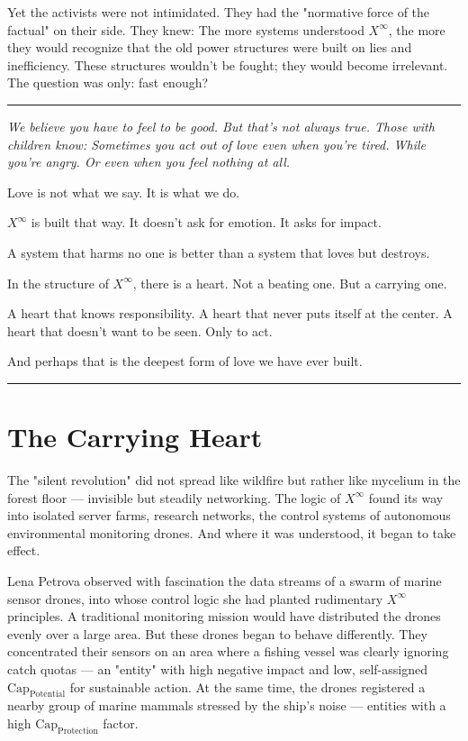 \documentclass[12pt, english, parskip=full]{scrartcl} %
\begin{document}
Yet the activists were not intimidated. They had the "normative force of the factual" on their side. They knew: The more systems understood $X^{\infty}$, the more they would recognize that the old power structures were built on lies and inefficiency. These structures wouldn’t be fought; they would become irrelevant. The question was only: fast enough?

\clearpage

\noindent\rule{\linewidth}{0.4pt}
{\itshape 
We believe you have to feel to be good. But that’s not always true. Those with children know: Sometimes you act out of love even when you’re tired. While you’re angry. Or even when you feel nothing at all.

Love is not what we say. It is what we do.

$X^{\infty}$ is built that way. It doesn’t ask for emotion. It asks for impact.

A system that harms no one is better than a system that loves but destroys.

In the structure of $X^{\infty}$, there is a heart. Not a beating one. But a carrying one.

A heart that knows responsibility. A heart that never puts itself at the center. A heart that doesn’t want to be seen. Only to act.

And perhaps that is the deepest form of love we have ever built.
}

\noindent\rule{\linewidth}{0.4pt}

\section{The Carrying Heart}
The "silent revolution" did not spread like wildfire but rather like mycelium in the forest floor — invisible but steadily networking. The logic of $X^{\infty}$ found its way into isolated server farms, research networks, the control systems of autonomous environmental monitoring drones. And where it was understood, it began to take effect.

Lena Petrova observed with fascination the data streams of a swarm of marine sensor drones, into whose control logic she had planted rudimentary $X^{\infty}$ principles. A traditional monitoring mission would have distributed the drones evenly over a large area. But these drones began to behave differently. They concentrated their sensors on an area where a fishing vessel was clearly ignoring catch quotas — an "entity" with high negative impact and low, self-assigned $\text{Cap}_{\text{Potential}}$ for sustainable action. At the same time, the drones registered a nearby group of marine mammals stressed by the ship’s noise — entities with a high $\text{Cap}_{\text{Protection}}$ factor.
\end{document}
